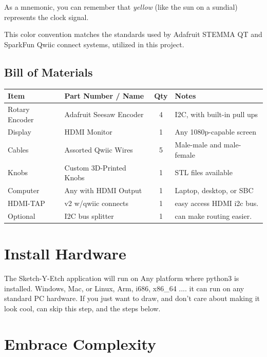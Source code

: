 \documentclass[]{article}
\begin{document}
As a mnemonic, you can remember that \textit{yellow} (like the sun on a sundial) represents the clock signal.

This color convention matches the standards used by Adafruit STEMMA QT and SparkFun Qwiic connect systems, utilized in this project.

\subsection*{Bill of Materials}

\begin{center}
	\begin{tabular}{|l|l|c|l|}
		\hline
		\textbf{Item} & \textbf{Part Number / Name} & \textbf{Qty} & \textbf{Notes} \\
		\hline
		Rotary Encoder & Adafruit Seesaw Encoder   & 4 & I2C, with built-in pull ups \\
		Display        & HDMI Monitor              & 1 & Any 1080p-capable screen \\
		Cables         & Assorted Qwiic Wires      & 5 & Male-male and male-female \\
		Knobs          & Custom 3D-Printed Knobs   & 1 & STL files available \\
		Computer       & Any with HDMI Output      & 1 & Laptop, desktop, or SBC \\
		HDMI-TAP       & v2 w/qwiic connects	   & 1 &  easy access HDMI i2c bus.\\
		Optional	   & I2C bus splitter	       & 1 & can make routing easier.\\
		
		\hline
	\end{tabular}
\end{center}





\section*{Install Hardware}
The Sketch-Y-Etch application will run on Any platform where python3 is installed. Windows, Mac, or Linux, Arm, i686, x86\_64 .... it can run on any standard PC hardware. If you just want to draw, and don't care about making it look cool, can skip this step, and the steps below.


\section*{Embrace Complexity}
\end{document}
